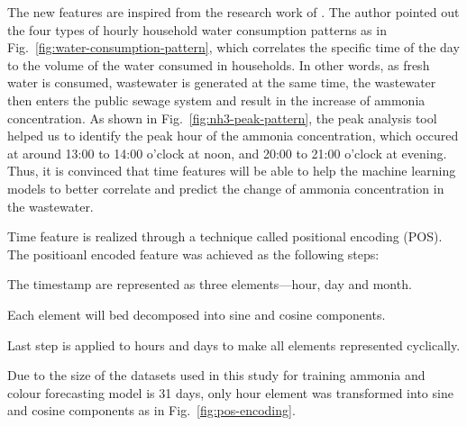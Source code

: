 The new features are inspired from the research work of \citet{abu-bakarQuantifyingImpactCOVID192021}. The author pointed out the four types of hourly household water consumption patterns as in Fig.~\ref{fig:water-consumption-pattern}, which correlates the specific time of the day to the volume of the water consumed in households. In other words, as fresh water is consumed, wastewater is generated at the same time, the wastewater then enters the public sewage system and result in the increase of ammonia concentration. As shown in Fig.~\ref{fig:nh3-peak-pattern}, the peak analysis tool helped us to identify the peak hour of the ammonia concentration, which occured at around 13:00 to 14:00 o'clock at noon, and 20:00 to 21:00 o'clock at evening. Thus, it is convinced that time features will be able to help the machine learning models to better correlate and predict the change of ammonia concentration in the wastewater. 

Time feature is realized through a technique called positional encoding (POS). The positioanl encoded feature was achieved as the following steps:

\noindent
\begin{myenumerate}
    \item The timestamp are represented as three elements---hour, day and month.
    \item Each element will bed decomposed into sine and cosine components.
    \item Last step is applied to hours and days to make all elements represented cyclically.
\end{myenumerate}

Due to the size of the datasets used in this study for training ammonia and colour forecasting model is 31 days, only hour element was transformed into sine and cosine components as in Fig.~\ref{fig:pos-encoding}.

